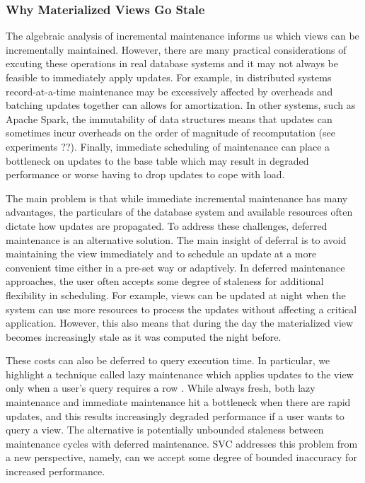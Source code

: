 \subsubsection{Why Materialized Views Go Stale}
The algebraic analysis of incremental maintenance informs us which views can be incrementally maintained.
However, there are many practical considerations of excuting these operations in real database systems and it may not always be feasible to immediately apply updates.
For example, in distributed systems record-at-a-time maintenance may be excessively affected by overheads and batching updates together can allows for amortization.
In other systems, such as Apache Spark, the immutability of data structures means that updates can sometimes incur overheads on the order of magnitude of recomputation (see experiments ??).
Finally, immediate scheduling of maintenance can place a bottleneck on updates to the base table which may result in degraded performance or worse having to drop updates to cope with load.

The main problem is that while immediate incremental maintenance has many advantages, the particulars of the database system and available resources often dictate how updates are propagated.
To address these challenges, deferred maintenance is an alternative solution.
The main insight of deferral is to avoid maintaining the view immediately and to schedule an update at a more convenient time either in a pre-set way or adaptively.
In deferred maintenance approaches, the user often accepts some degree of staleness for additional flexibility in scheduling.
For example, views can be updated at night when the system can use more resources to process the updates without affecting a critical application.
However, this also means that during the day the materialized view becomes increasingly stale as it was computed the night before.

These costs can also be deferred to query execution time.
In particular, we highlight a technique called lazy maintenance which applies updates to the view only when a user's query requires a row \cite{zhou2007lazy}.
While always fresh, both lazy maintenance and immediate maintenance hit a bottleneck when there are rapid updates, and this results increasingly degraded performance if a user wants to query a view.
The alternative is potentially unbounded staleness between maintenance cycles with deferred maintenance.
SVC addresses this problem from a new perspective, namely, can we accept some degree of bounded inaccuracy for increased performance.


